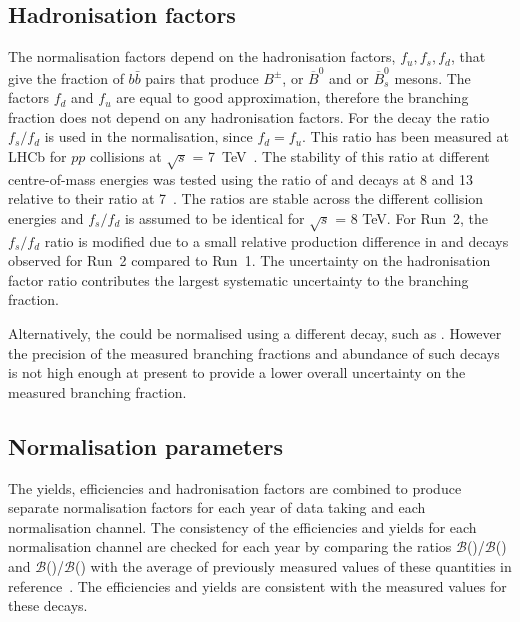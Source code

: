{\subsection{Hadronisation factors}
\label{hadronfact}
The normalisation factors depend on the hadronisation factors, $f_{u}, f_{s}, f_{d}$, that give the fraction of $b\bar{b}$ pairs that produce $B^{\pm}$, \bd or $\overline{B}^{0}$ and \bs or $\overline{B}^{0}_{s}$ mesons. %
The factors $f_{d}$ and $f_{u}$ are equal to good approximation, therefore the \bdmumu branching fraction does not depend on any hadronisation factors. For the \bsmumu decay the ratio $f_{s}/f_{d}$ is used in the normalisation, since $f_{d} = f_{u}$. This ratio has been measured at LHCb for $pp$ collisions at $\sqrt{s}$ = 7~TeV~\cite{LHCb-CONF-2013-011}. The stability of this ratio at different centre-of-mass energies was tested using the ratio of \bsjpsiphi and \bujpsik decays at 8 and 13 \tev relative to their ratio at 7~\tev. %
The ratios are stable across the different collision energies and $f_{s}/f_{d}$ is assumed to be identical for $\sqrt{s}$ = 8 TeV. For Run~2, the $f_{s}/f_{d}$ ratio is modified due to a small relative production difference in \bsjpsiphi and \bujpsik decays observed for Run~2 compared to Run~1. 
The uncertainty on the hadronisation factor ratio contributes the largest systematic uncertainty to the \bsmumu branching fraction. 

Alternatively, the \bsmumu \BF could be normalised using a different \bs decay, such as \bsjpsiphi. However the precision of the measured branching fractions and abundance of such decays is not high enough at present to provide a lower overall uncertainty on the measured branching fraction.

\subsection{Normalisation parameters}
\label{normparams}
The yields, efficiencies and hadronisation factors are combined to produce separate normalisation factors for each year of data taking and each normalisation channel. The consistency of the efficiencies and yields for each normalisation channel are checked for each year by comparing the ratios $\mathcal{B}$(\bdkpi)/$\mathcal{B}$(\bujpsik) and $\mathcal{B}$(\bujpsik)/$\mathcal{B}$(\bsjpsiphi) with the average of previously measured values of these quantities in reference~\cite{Olive:2016xmw}. The efficiencies and yields are consistent with the measured values for these decays. 


}

